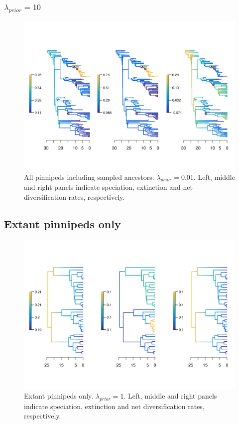 \documentclass[a4paper, 12pt]{article}
\begin{document}
\subsubsection{$\lambda_{prior} = 10$}

\begin{figure}[H]
  \centering
  \includegraphics[width = \linewidth]{figures/diversification/sensitivity-analyses-with-sampled-ancestors/shifts-10/sensitivity-analysis-with-sampled-ancestors-10.png}
  \caption{All pinnipeds including sampled ancestors. $\lambda_{prior} = 0.01$. Left, middle and right panels indicate speciation, extinction and net diversification rates, respectively.}
  \label{fig-full-10}
\end{figure}


\subsection{Extant pinnipeds only}

\begin{figure}[H]
  \centering
  \includegraphics[width = \linewidth]{figures/diversification/extant-only/sensitivity-analysis-extant-only.png}
  \caption{Extant pinnipeds only. $\lambda_{prior} = 1$. Left, middle and right panels indicate speciation, extinction and net diversification rates, respectively.}
  \label{fig-extant-only}
\end{figure}
\end{document}
